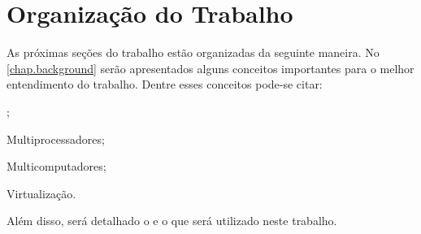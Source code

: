 \section{Organização do Trabalho}
\label{sec.organization}

As próximas seções do trabalho estão organizadas da seguinte maneira. No \autoref{chap.background} serão apresentados alguns conceitos importantes para o melhor entendimento do trabalho. Dentre esses conceitos pode-se citar:
\begin{inlinelist}[label= (\roman*)]
    \item \Lws;
    \item Multiprocessadores;
    \item Multicomputadores;
    \item Virtualização.
\end{inlinelist}
Além disso, será detalhado o \os e o \lw que será utilizado neste trabalho.

